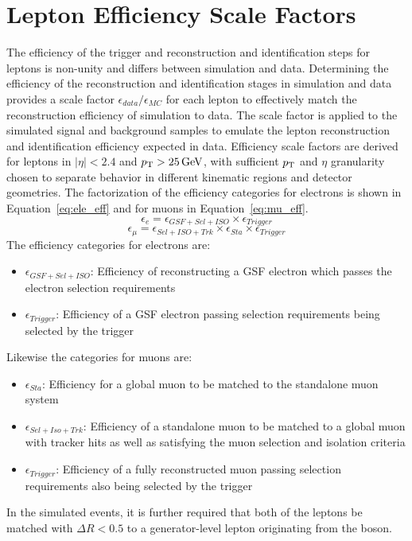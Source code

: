 
\chapter{Lepton Efficiency Scale Factors}\label{ch:eff}
The efficiency of the trigger and reconstruction and identification steps for leptons is non-unity and differs between simulation and data. Determining the efficiency of the reconstruction and identification stages in simulation and data provides a scale factor $\epsilon_{data}/\epsilon_{MC}$ for each lepton to effectively match the reconstruction efficiency of simulation to data. The scale factor is applied to the simulated signal and background samples to emulate the lepton reconstruction and identification efficiency expected in data. Efficiency scale factors are derived for leptons in $|\eta|<2.4$ and $p_{\mathrm{T}}>25\,\text{Ge\hspace{-.08em}V}$, with sufficient $p_{\mathrm{T}}$ and $\eta$ granularity chosen to separate behavior in different kinematic regions and detector geometries. The factorization of the efficiency categories for electrons is shown in Equation~\ref{eq:ele_eff} and for muons in Equation~\ref{eq:mu_eff}.
\begin{equation}
  \epsilon_{e} = \epsilon_{GSF+Sel+ISO} \times \epsilon_{Trigger}
  \label{eq:ele_eff}
\end{equation}
\begin{equation}
  \epsilon_{\mu} = \epsilon_{Sel+ISO+Trk} \times  \epsilon_{Sta} \times \epsilon_{Trigger}
  \label{eq:mu_eff}
\end{equation}
The efficiency categories for electrons are:
\begin{itemize}
    \item $\epsilon_{GSF+Sel+ISO}$: Efficiency of reconstructing a GSF electron which passes the electron selection requirements
    \item $\epsilon_{Trigger}$: Efficiency of a GSF electron passing selection requirements being selected by the trigger
\end{itemize}
Likewise the categories for muons are:
\begin{itemize}
    \item $\epsilon_{Sta}$: Efficiency for a global muon to be matched to the standalone muon system
    \item $\epsilon_{Sel+Iso+Trk}$: Efficiency of a standalone muon to be matched to a global muon with tracker hits as well as satisfying the muon selection and isolation criteria
    \item $\epsilon_{Trigger}$: Efficiency of a fully reconstructed muon passing selection requirements also being selected by the trigger
\end{itemize}
In the simulated \zll events, it is further required that both of the leptons be matched with $\Delta R < 0.5$ to a generator-level lepton originating from the \Z boson. 



